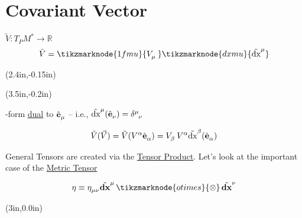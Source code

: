 \documentclass{article}
\begin{document}
\section*{Covariant Vector}
$\tilde{V} : T_P M^* \rightarrow \mathbb{R}$
\begin{equation*}
    \tilde{V} = \tikzmarknode{1fmu}{\tensor{V}{_\mu}} \tikzmarknode{dxmu}{\tensor{\tilde{\mathrm{dx}}}{^\mu}}
\end{equation*}
{%
\begin{textblock*}{1in}(2.4in,-0.15in)%
\begin{minipage}[h!]{1in}
\end{minipage}%
\end{textblock*}%
}%
{%
\begin{textblock*}{3in}(3.5in,-0.2in)%
\begin{minipage}[h!]{3in}
    -form \underline{dual} to $\tensor{\hat{\mathbf{e}}}{_\mu}$ -- i.e., $\tensor{\tilde{\mathrm{dx}}}{^\mu} ( \tensor{\hat{\mathbf{e}}}{_\nu} ) = \tensor{\delta}{^\mu_\nu} $
\end{minipage}%
\end{textblock*}%
}

\vspace{-24pt} \begin{equation*}
    \tilde{V} (\vec{V}) = \tilde{V} ( \tensor{V}{^\alpha} \tensor{\hat{\mathbf{e}}}{_\alpha} ) = \tensor{V}{_\beta} \tensor{V}{^\alpha} \tensor{\tilde{\mathrm{dx}}}{^\beta} ( \tensor{\hat{\mathbf{e}}}{_\alpha} )
\end{equation*}

\noindent General Tensors are created via the \underline{Tensor Product}. Let's look at the important case of the \underline{Metric Tensor}

\begin{equation*}
\mathbf{\eta} \equiv \tensor{\eta}{_\mu_\nu} \tensor{\tilde{\mathbf{dx}}}{^\mu} \,\tikzmarknode{otimes}{\otimes}\, \tensor{\tilde{\mathbf{dx}}}{^\nu}
\end{equation*}
{%
\begin{textblock*}{1in}(3in,0.0in)%
\begin{minipage}[h!]{3in}
\end{minipage}%
\end{textblock*}%
}
\end{document}
